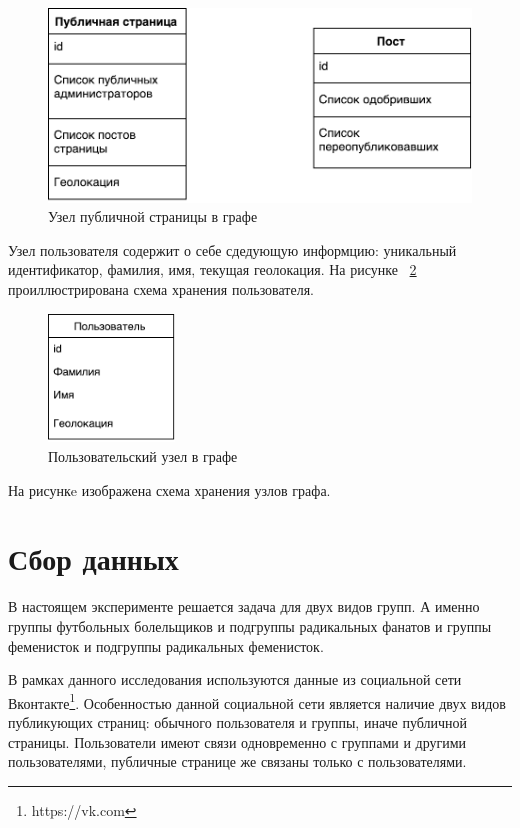 \documentclass[annotation,times,page4]{itmo-student-thesis}
\begin{document}
\begin{figure}[!h]
\caption{Узел публичной страницы в графе}
\label{fig:public}
\centering
\includegraphics[width=\textwidth]{figs/public.pdf}
\end{figure}

Узел пользователя содержит о себе сдедующую информцию: уникальный идентификатор, фамилия, имя, текущая геолокация. На рисунке ~\ref{fig:user} проиллюстрирована схема хранения пользователя.

\begin{figure}[!h]
\caption{Пользовательский узел в графе}
\label{fig:user}
\centering
\includegraphics[width=0.3\textwidth]{figs/user.pdf}
\end{figure}


На рисункe изображена схема хранения узлов графа.    

\section{Сбор данных}
В настоящем эксперименте решается задача для двух видов групп. А именно группы футбольных болельщиков и подгруппы радикальных фанатов и группы феменисток и подгруппы радикальных феменисток. 

В рамках данного исследования используются данные из социальной сети Вконтакте\footnote{https://vk.com}. Особенностью данной социальной сети является наличие двух видов публикующих страниц: обычного пользователя и группы, иначе публичной страницы. Пользователи имеют связи одновременно с группами и другими пользователями, публичные странице же связаны только с пользователями. 
\end{document}
